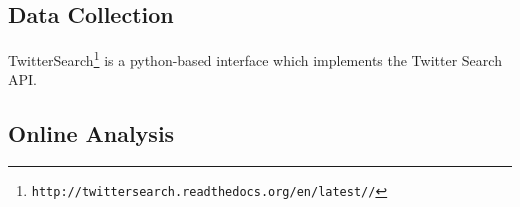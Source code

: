 \documentclass{article}
\begin{document}
\subsection{Data Collection}
TwitterSearch\footnote{\texttt{\scriptsize{http://twittersearch.readthedocs.org/en/latest//‎‎}}} is a python-based interface which implements the Twitter Search API. 
\subsection{Online Analysis}
\cite{agarwal2011sentiment}



\end{document}
